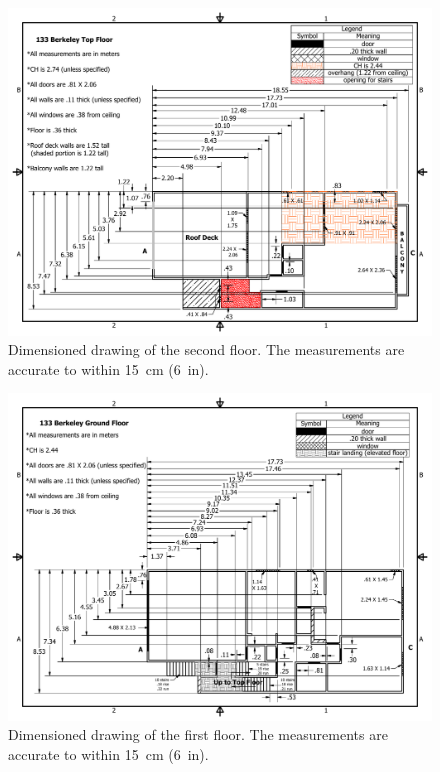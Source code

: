 \documentclass[12pt,oneside]{book}
\begin{document}
\begin{figure}[!ht]
\includegraphics[width=6.5in]{../Figures/Top_Floor_Metric}
\caption[Dimensioned drawing of the second floor.]{Dimensioned drawing of the second floor. The measurements are accurate to within 15~cm (6~in).}
\label{fig:drawing_second_floor}
\end{figure}

\begin{figure}[!ht]
\includegraphics[width=6.5in]{../Figures/Ground_Floor_Metric}
\caption[Dimensioned drawing of the first floor.]{Dimensioned drawing of the first floor. The measurements are accurate to within 15~cm (6~in).}
\label{fig:drawing_first_floor}
\end{figure}
\end{document}
